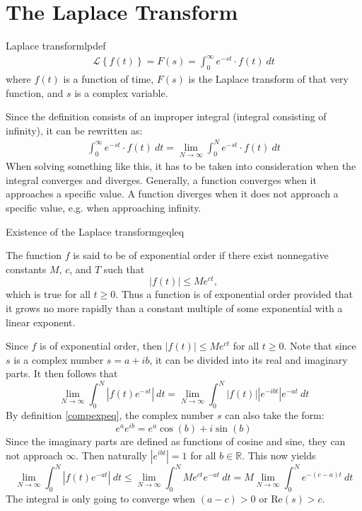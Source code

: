 \section{The Laplace Transform}
\begin{definition}{Laplace transform}{lpdef}
\begin{align}
\mathcal{L} \left\{f(t) \right\}=F(s)=\int_{0}^{\infty} e^{-st}\cdot f(t)\ dt
\end{align}
where $f(t)$ is a function of time, $F(s)$ is the Laplace transform of that very function, and $s$ is a complex variable.
\end{definition}
Since the definition consists of an improper integral (integral consisting of infinity), it can be rewritten as:
\begin{align}
\int_{0}^{\infty} e^{-st}\cdot f(t)\ dt = \lim_{N \to \infty} \int_{0}^{N} e^{-st}\cdot f(t)\ dt
\end{align}
When solving something like this, it has to be taken into consideration when the integral converges and diverges. Generally, a function converges when it approaches a specific value. A function diverges when it does not approach a specific value, e.g. when approaching infinity.

\begin{theorem}{Existence of the Laplace transform}{geqleq}

The function $f$ is said to be of exponential order if there exist nonnegative constants $M$, $c$, and $T$  such that $$|f(t)| \leq Me^{ct},$$
which is true for all $t \geq 0$. Thus a function is of exponential order provided that it grows no more rapidly than a constant multiple of some exponential with a linear exponent. \cite[p. 320]{diffandcomplex}
\end{theorem}
\begin{prof}{}{}
Since $f$ is of exponential order, then $|f(t)| \leq Me^{ct}$ for all $t \geq 0$. Note that since $s$ is a complex number  $s=a+ib$, it can be divided into its real and imaginary parts. It then follows that $$\lim_{N \to \infty} \int_{0}^{N} |f(t)e^{-st}|\ dt = \lim_{N \to \infty} \int_{0}^{N} |f(t)| |e^{-ibt}|e^{-at}\ dt$$
By definition \ref{compexpeq}, the complex number $s$ can also take the form: 
$$e^{a}e^{ib}= e^{a}\cos(b)+i\sin(b)$$
Since the imaginary parts are defined as functions of cosine and sine, they can not approach $\infty$. Then naturally $|e^{ibt}|=1$ for all $b \in \mathbb{R}$. This now yields $$\lim_{N \to \infty} \int_{0}^{N} |f(t)e^{-at}|\ dt \leq \lim_{N \to \infty} \int_{0}^{N} Me^{ct}e^{-at}\ dt = M \lim_{N \to \infty} \int_{0}^{N}e^{-(c-a)t}\ dt $$ The integral is only going to converge when $(a-c)>0$ or Re$(s)>c$.
\end{prof}

